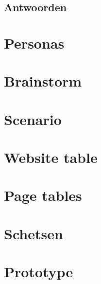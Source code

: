 \documentclass[a4paper,12pt]{article}
\begin{document}
\subsection{Antwoorden}

\section{Personas}

\section{Brainstorm}

\section{Scenario}

\section{Website table}

\section{Page tables}

\section{Schetsen}

\section{Prototype}
\end{document}
